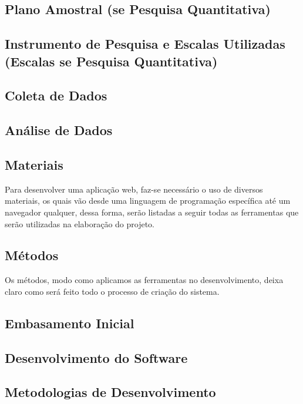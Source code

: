 \documentclass[
	article,			%
	12pt,				%
	oneside,			%
	a4paper,			%
    BIBLATEX,           %
	english,			%
	brazil,				%
	sumario=tradicional
	]{abntex2}
\begin{document}
\subsection{Plano Amostral (se Pesquisa Quantitativa)}
\lipsum[1]

\subsection{Instrumento de Pesquisa e Escalas Utilizadas (Escalas se Pesquisa Quantitativa)}
\lipsum[1]

\subsection{Coleta de Dados}
\lipsum[1]

\subsection{Análise de Dados}
\lipsum[1]

\subsection{Materiais}
Para desenvolver uma aplicação web, faz-se necessário o uso de diversos materiais, os quais vão desde uma linguagem de programação específica até um navegador qualquer, dessa forma, serão listadas a seguir todas as ferramentas que serão utilizadas na elaboração do projeto.
	
 \subsection{Métodos}
Os métodos, modo como aplicamos as ferramentas no desenvolvimento, deixa claro como será feito todo o processo de criação do sistema.

\subsection{Embasamento Inicial}
\lipsum[1]

\subsection{Desenvolvimento do Software}
\lipsum[1]

\subsection{Metodologias de Desenvolvimento}
\lipsum[1]
\end{document}
